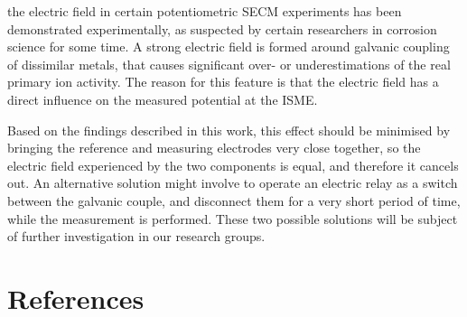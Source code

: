 \documentclass[3p]{elsarticle}
\begin{document}
the electric field in certain potentiometric SECM experiments has been demonstrated experimentally, as suspected by certain researchers in corrosion science for some time. A strong electric field is formed around galvanic coupling of dissimilar metals, that causes significant over- or underestimations of the real primary ion activity. The reason for this feature is that the electric field has a direct influence on the measured potential at the ISME.

Based on the findings described in this work, this effect should be minimised by bringing the reference and measuring electrodes very close together, so the electric field experienced by the two components is equal, and therefore it cancels out. An alternative solution might involve to operate an electric relay as a switch between the galvanic couple, and disconnect them for a very short period of time, while the measurement is performed. These two possible solutions will be subject of further investigation in our research groups.


\section*{References}
\end{document}
